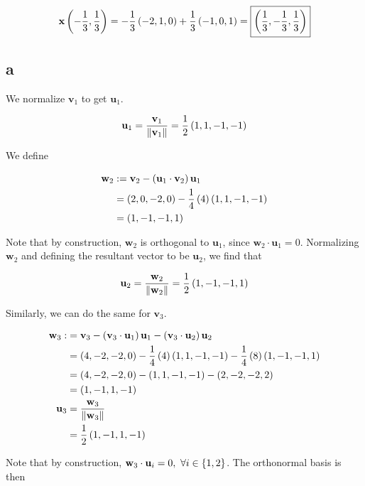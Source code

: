 \documentclass{article}
\begin{document}
$$
\textbf{x} \left (  - \frac{1}{3}, \frac{1}{3} \right) = - \frac{1}{3} \left ( -2, 1, 0 \right) + \frac{1}{3} \left ( -1, 0, 1 \right) = \boxed{\left ( \frac{1}{3}, - \frac{1}{3}, \frac{1}{3} \right)}
$$


\subsection*{a}

We normalize $\bm{v}_1$ to get $\bm{u}_1$.

$$
\textbf{u}_1 = \frac{\textbf{v}_1}{\left\lVert\textbf{v}_1\right\rVert} = \frac{1}{2} \left ( 1, 1, -1, -1 \right)
$$

We define

\begin{align*}
  \textbf{w}_2 &:= \textbf{v}_2 - \left ( \textbf{u}_1 \cdot \textbf{v}_2 \right) \textbf{u}_1 \\
           &= \left ( 2, 0, -2, 0 \right) - \frac{1}{4} \left ( 4 \right) \left ( 1, 1, -1, -1 \right) \\
           &= \left ( 1, -1, -1, 1 \right) \\
\end{align*}

Note that by construction, $\bm{w}_2$ is orthogonal to $\bm{u}_1$, since $\bm{w}_2 \cdot \bm{u}_1 = 0$.
Normalizing $\bm{w}_2$ and defining the resultant vector to be $\bm{u}_2$, we find that

$$
\textbf{u}_2 = \frac{\textbf{w}_2}{\left\lVert\textbf{w}_2\right\rVert} = \frac{1}{2} \left ( 1, -1, -1, 1 \right)
$$

Similarly, we can do the same for $\bm{v}_3$.

\begin{align*}
  \textbf{w}_3 :&= \textbf{v}_3 - \left ( \textbf{v}_3 \cdot \textbf{u}_1 \right) \textbf{u}_1 - \left ( \textbf{v}_3 \cdot \textbf{u}_2 \right) \textbf{u}_2 \\
            &= \left ( 4, -2, -2, 0 \right) - \frac{1}{4} \left ( 4 \right) \left ( 1, 1, -1, -1 \right) - \frac{1}{4} \left ( 8 \right) \left ( 1, -1, -1, 1 \right) \\
            &= \left ( 4, -2, -2, 0 \right) - \left ( 1, 1, -1, -1 \right) - \left ( 2, -2, -2, 2 \right) \\
            &= \left ( 1, -1, 1, -1 \right) \\
  \textbf{u}_3 &= \frac{\textbf{w}_3}{\left\lVert\textbf{w}_3\right\rVert} \\
            &= \frac{1}{2} \left ( 1, -1, 1, -1 \right) \\
\end{align*}

Note that by construction, $\textbf{w}_3 \cdot \textbf{u}_i = 0,\ \forall i \in \left \{ 1, 2 \right \}$.
The orthonormal basis is then
\end{document}
